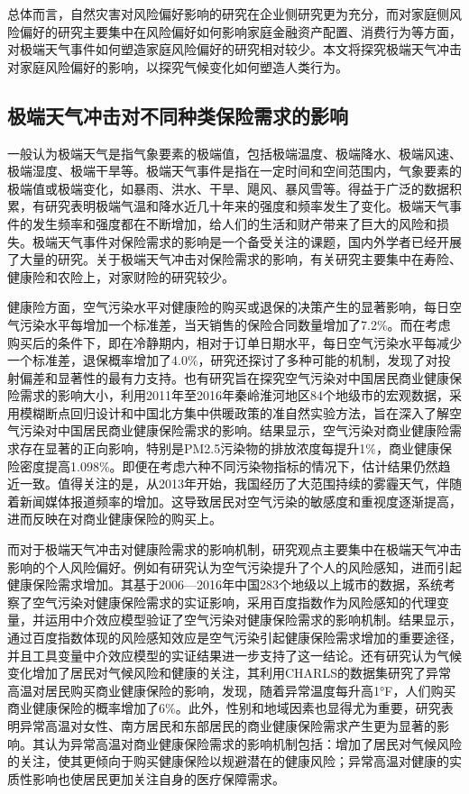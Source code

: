 总体而言，自然灾害对风险偏好影响的研究在企业侧研究更为充分，而对家庭侧风险偏好的研究主要集中在风险偏好如何影响家庭金融资产配置、消费行为等方面，对极端天气事件如何塑造家庭风险偏好的研究相对较少。本文将探究极端天气冲击对家庭风险偏好的影响，以探究气候变化如何塑造人类行为。

\subsection{极端天气冲击对不同种类保险需求的影响}

一般认为极端天气是指气象要素的极端值，包括极端温度、极端降水、极端风速、极端湿度、极端干旱等\citep{傅良2022ECMWF,吴大明2021近年来全球极端天气气候事件情况及影响分析}。极端天气事件是指在一定时间和空间范围内，气象要素的极端值或极端变化，如暴雨、洪水、干旱、飓风、暴风雪等。得益于广泛的数据积累，有研究表明极端气温和降水近几十年来的强度和频率发生了变化\citep{ummenhofer2017extreme}。极端天气事件的发生频率和强度都在不断增加，给人们的生活和财产带来了巨大的风险和损失。极端天气事件对保险需求的影响是一个备受关注的课题，国内外学者已经开展了大量的研究。关于极端天气冲击对保险需求的影响，有关研究主要集中在寿险、健康险和农险上，对家财险的研究较少。

健康险方面，空气污染水平对健康险的购买或退保的决策产生的显著影响\citep{2018Something}，每日空气污染水平每增加一个标准差，当天销售的保险合同数量增加了7.2\%。而在考虑购买后的条件下，即在冷静期内，相对于订单日期水平，每日空气污染水平每减少一个标准差，退保概率增加了4.0\%，研究还探讨了多种可能的机制，发现了对投射偏差和显著性的最有力支持。也有研究旨在探究空气污染对中国居民商业健康保险需求的影响大小\citep{赵强2021空气污染对商业健康保险需求的影响}，利用2011年至2016年秦岭淮河地区84个地级市的宏观数据，采用模糊断点回归设计和中国北方集中供暖政策的准自然实验方法，旨在深入了解空气污染对中国居民商业健康保险需求的影响。结果显示，空气污染对商业健康险需求存在显著的正向影响，特别是PM2.5污染物的排放浓度每提升1\%，商业健康保险密度提高1.098\%。即便在考虑六种不同污染物指标的情况下，估计结果仍然趋近一致。值得关注的是，从2013年开始，我国经历了大范围持续的雾霾天气，伴随着新闻媒体报道频率的增加。这导致居民对空气污染的敏感度和重视度逐渐提高，进而反映在对商业健康保险的购买上。

而对于极端天气冲击对健康险需求的影响机制，研究观点主要集中在极端天气冲击影响的个人风险偏好。例如有研究认为空气污染提升了个人的风险感知，进而引起健康保险需求增加\citep{宋平凡2022空气污染}。其基于2006—2016年中国283个地级以上城市的数据，系统考察了空气污染对健康保险需求的实证影响，采用百度指数作为风险感知的代理变量，并运用中介效应模型验证了空气污染对健康保险需求的影响机制。结果显示，通过百度指数体现的风险感知效应是空气污染引起健康保险需求增加的重要途径，并且工具变量中介效应模型的实证结果进一步支持了这一结论。还有研究认为气候变化增加了居民对气候风险和健康的关注\cite{zhong2022exposure}，其利用CHARLS的数据集研究了异常高温对居民购买商业健康保险的影响，发现，随着异常温度每升高1°F，人们购买商业健康保险的概率增加了6\%。此外，性别和地域因素也显得尤为重要，研究表明异常高温对女性、南方居民和东部居民的商业健康保险需求产生更为显著的影响。其认为异常高温对商业健康保险需求的影响机制包括：增加了居民对气候风险的关注，使其更倾向于购买健康保险以规避潜在的健康风险；异常高温对健康的实质性影响也使居民更加关注自身的医疗保障需求。


